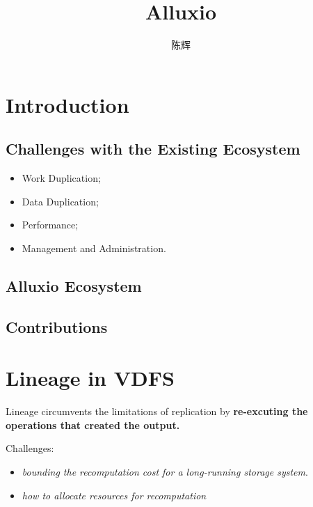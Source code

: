 \documentclass{article}
\title{Alluxio}
\author{陈辉}
\date{}
\begin{document}
\maketitle
\tableofcontents
\newpage
\section{Introduction}

\subsection{Challenges with the Existing Ecosystem}
\begin{itemize}
    \item Work Duplication;
    \item Data Duplication;
    \item Performance;
    \item Management and Administration.
\end{itemize}

\setcounter{subsection}{3}
\subsection{Alluxio Ecosystem}
\subsection{Contributions}

\section{Lineage in VDFS}
Lineage circumvents the limitations of replication by \textbf{re-excuting the operations that created the output.}
\par
Challenges:
\begin{itemize}
        \item \textit{bounding the recomputation cost for a long-running storage system}.
        \item \textit{how to allocate resources for recomputation}
\end{itemize}
\end{document}
